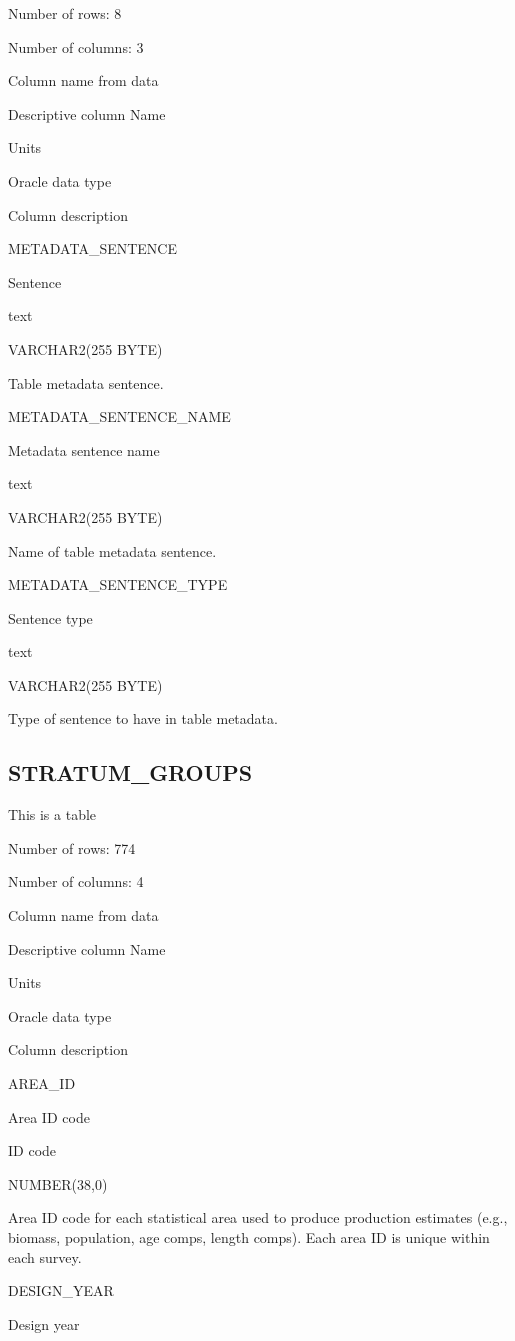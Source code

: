 \documentclass[
  letterpaper,
  oneside,
  open=any]{scrbook}
\begin{document}
Number of rows: 8

Number of columns: 3

Column name from data

Descriptive column Name

Units

Oracle data type

Column description

METADATA\_SENTENCE

Sentence

text

VARCHAR2(255 BYTE)

Table metadata sentence.

METADATA\_SENTENCE\_NAME

Metadata sentence name

text

VARCHAR2(255 BYTE)

Name of table metadata sentence.

METADATA\_SENTENCE\_TYPE

Sentence type

text

VARCHAR2(255 BYTE)

Type of sentence to have in table metadata.

\hypertarget{stratum_groups}{%
\subsection{STRATUM\_GROUPS}\label{stratum_groups}}

This is a table

Number of rows: 774

Number of columns: 4

Column name from data

Descriptive column Name

Units

Oracle data type

Column description

AREA\_ID

Area ID code

ID code

NUMBER(38,0)

Area ID code for each statistical area used to produce production
estimates (e.g., biomass, population, age comps, length comps). Each
area ID is unique within each survey.

DESIGN\_YEAR

Design year
\end{document}
